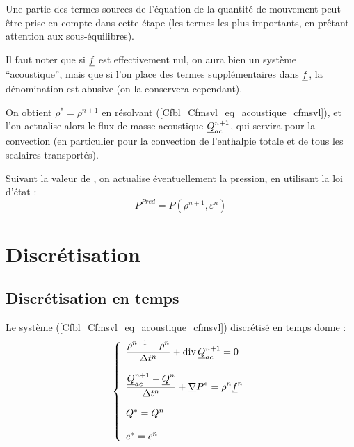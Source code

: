 Une partie des termes sources de l'équation de la
quantité de mouvement peut être prise en compte dans cette étape
(les termes les plus importants, en prêtant attention aux sous-équilibres).

Il faut noter que si $\underline{f}$ est effectivement nul, on aura bien un
système ``acoustique'', mais que si l'on place des termes supplémentaires
dans $\underline{f}$, la dénomination est abusive (on la conservera cependant).

On obtient $\rho^* = \rho^{n+1}$ en résolvant (\ref{Cfbl_Cfmsvl_eq_acoustique_cfmsvl}),
et l'on actualise alors le flux de masse acoustique $\underline{Q}_{ac}^{n+1}$,
qui servira pour la convection (en particulier pour la convection de
l'enthalpie totale et de tous les scalaires transportés).

Suivant la valeur de , on actualise éventuellement la pression, en
utilisant la loi d'état :
$$
\displaystyle P^{Pred}=P(\rho^{n+1},\varepsilon^{n})
$$

\section*{Discrétisation}
\subsection*{Discrétisation en temps}

Le système (\ref{Cfbl_Cfmsvl_eq_acoustique_cfmsvl}) discrétisé en temps donne :
\begin{equation}\label{Cfbl_Cfmsvl_eq_acoustique_discrete_cfmsvl}
\left\{\begin{array}{l}

\displaystyle\frac{\rho^{n+1}-\rho^n}{\Delta t^n}
+ \text{div}\,{\underline{Q}_{ac}^{n+1}} = 0 \\
\\
\displaystyle\frac{\underline{Q}_{ac}^{n+1}-\underline{Q}^n}{\Delta t^n}+\underline{\nabla}{P^*} =
\rho^n \underline{f}^n\\
\\
Q^*=Q^n\\
\\
e^*=e^n\\

\end{array}\right.
\end{equation}

